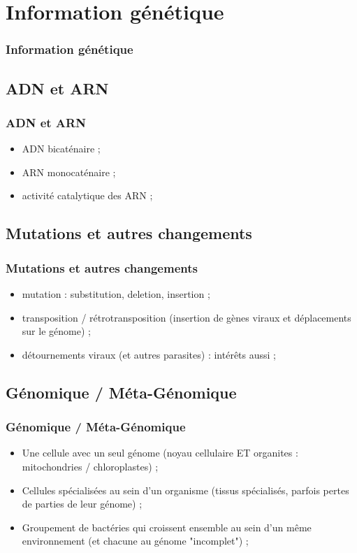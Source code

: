 \documentclass{beamer}
\begin{document}

\section{Information g{\'e}n{\'e}tique }
\begin{frame}
	\frametitle{Information g{\'e}n{\'e}tique }
	\tableofcontents[sections=4,currentsection,subsectionstyle=show/shaded/hide]
\end{frame} 

\subsection{ ADN et ARN }
\begin{frame}
	\frametitle{ ADN et ARN }
	\begin{itemize}
		\item ADN bicat{\'e}naire ; 
		\item ARN monocat{\'e}naire ; 
		\item activit{\'e} catalytique des ARN ; 
	\end{itemize}
\end{frame}

\subsection{ Mutations et autres changements }
\begin{frame}
	\frametitle{ Mutations et autres changements }
	\begin{itemize}
		\item mutation : substitution, deletion, insertion ; 
		\item transposition / r{\'e}trotransposition (insertion de g{\`e}nes viraux et d{\'e}placements sur le g{\'e}nome) ; 
		\item d{\'e}tournements viraux (et autres parasites) : int{\'e}r{\^e}ts aussi ; 
	\end{itemize}
\end{frame}

\subsection{ G{\'e}nomique / M{\'e}ta-G{\'e}nomique }
\begin{frame}
	\frametitle{ G{\'e}nomique / M{\'e}ta-G{\'e}nomique }
	\begin{itemize}
		\item Une cellule avec un seul g{\'e}nome (noyau cellulaire ET organites : mitochondries / chloroplastes) ; 
		\item Cellules sp{\'e}cialis{\'e}es au sein d'un organisme (tissus sp{\'e}cialis{\'e}s, parfois pertes de parties de leur g{\'e}nome) ; 
		\item Groupement de bact{\'e}ries qui croissent ensemble au sein d'un m{\^e}me environnement (et chacune au g{\'e}nome "incomplet") ;
	\end{itemize}
\end{frame}
\end{document}

